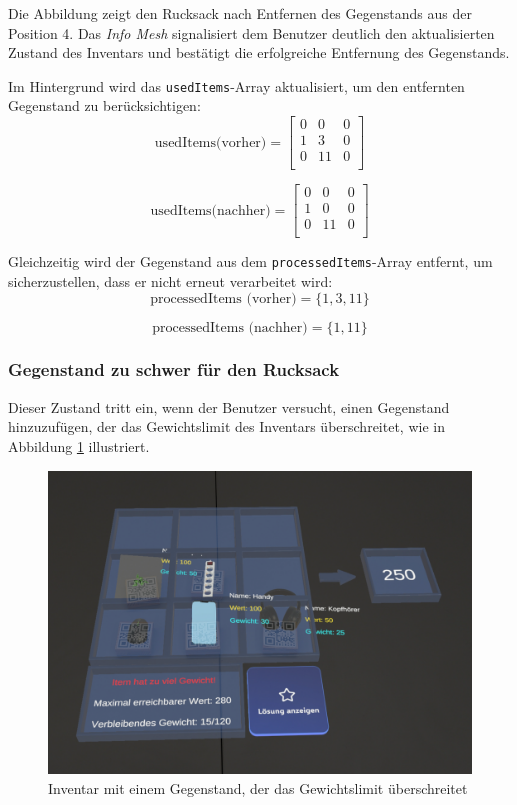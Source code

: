 \begin{itemize}
Die Abbildung zeigt den Rucksack nach Entfernen des Gegenstands aus der Position 4. Das \textit{Info Mesh} signalisiert
dem Benutzer deutlich den aktualisierten Zustand des Inventars und bestätigt die erfolgreiche Entfernung des Gegenstands.

Im Hintergrund wird das \texttt{usedItems}-Array aktualisiert, um den entfernten Gegenstand zu berücksichtigen:
\[
\text{usedItems(vorher)} =
\left[
\begin{array}{ccccc}
0 & 0 & 0 \\
1 & 3 & 0 \\
0 & 11 & 0 \\
\end{array}
\right]
\]

\[
\text{usedItems(nachher)} =
\left[
\begin{array}{ccccc}
0 & 0 & 0 \\
1 & 0 & 0 \\
0 & 11 & 0 \\
\end{array}
\right]
\]

Gleichzeitig wird der Gegenstand aus dem \texttt{processedItems}-Array entfernt, um sicherzustellen, dass er nicht
erneut verarbeitet wird:
\[
\text{processedItems (vorher)} = \{1, 3, 11\}
\]

\[
\text{processedItems (nachher)} = \{1, 11\}
\]

\subsubsection*{Gegenstand zu schwer für den Rucksack}
Dieser Zustand tritt ein, wenn der Benutzer versucht, einen Gegenstand hinzuzufügen, der das Gewichtslimit des Inventars
überschreitet, wie in Abbildung \ref{fig:controller_itemTooHeavy} illustriert.

\begin{figure}[H]
    \centering
    \includegraphics[width=\textwidth]{images/itemToHeavy}
    \caption{Inventar mit einem Gegenstand, der das Gewichtslimit überschreitet}
    \label{fig:controller_itemTooHeavy}
\end{figure}


\end{itemize}
